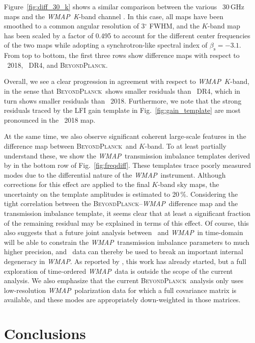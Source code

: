 \documentclass[twocolumn]{aa}
\def\WMAP{\textit{WMAP}}
\newcommand{\BP}{\textsc{BeyondPlanck}}
\begin{document}
Figure~\ref{fig:diff_30_k} shows a similar comparison between the
various \Planck\ 30\,GHz maps and the \WMAP\ \emph{K}-band channel
\citep{bennett2012}. In this case, all maps have been smoothed to a
common angular resolution of 3$^\circ$ FWHM, and the $K$-band map has
been scaled by a factor of 0.495 to account for the different center
frequencies of the two maps while adopting a synchrotron-like spectral
index of $\beta_{\mathrm{s}}=-3.1$. From top to bottom, the first
three rows show difference maps with respect to \Planck\ 2018, \Planck\ DR4,
and \BP.

Overall, we see a clear progression in agreement with respect to
\WMAP\ $K$-band, in the sense that \BP\ shows smaller residuals than
\Planck\ DR4, which in turn shows smaller residuals than
\Planck\ 2018. Furthermore, we note that the strong residuals traced
by the LFI gain template in Fig.~\ref{fig:gain_template} are most
pronounced in the \Planck\ 2018 map.

At the same time, we also observe significant coherent large-scale
features in the difference map between \BP\ and $K$-band. To at least
partially understand these, we show the \WMAP\ transmission imbalance
templates derived by \citet{jarosik2007} in the bottom row of
Fig.~\ref{fig:freqdiff}. These templates trace poorly measured modes
due to the differential nature of the \WMAP\ instrument. Although
corrections for this effect are applied to the final $K$-band sky
maps, the uncertainty on the template amplitudes is estimated to
20\,\%. Considering the tight correlation between the
\BP--\WMAP\ difference map and the transmission imbalance template, it
seems clear that at least a significant fraction of the remaining
residual may be explained in terms of this effect. Of course, this
also suggests that a future joint analysis between \Planck\ and
\WMAP\ in time-domain will be able to constrain the
\WMAP\ transmission imbalance parameters to much higher precision, and
\Planck\ data can thereby be used to break an important internal
degeneracy in \WMAP. As reported by \citet{bp17}, this work has
already started, but a full exploration of time-ordered \WMAP\ data is
outside the scope of the current analysis. We also emphasize that the
current \BP\ analysis only uses low-resolution \WMAP\ polarization data
for which a full covariance matrix is available, and these modes are
appropriately down-weighted in those matrices.

\section{Conclusions}
\label{sec:conclusions}
\end{document}
